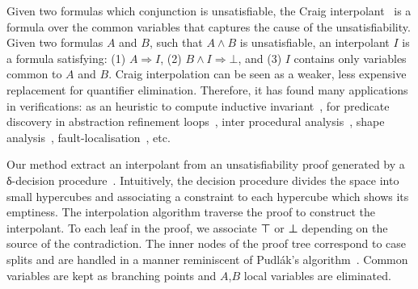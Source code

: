 Given two formulas which conjunction is unsatisfiable, the Craig interpolant~\cite{MR0104564} is a formula over the common variables that captures the cause of the unsatisfiability.
Given two formulas $A$ and $B$, such that $A ∧ B$ is unsatisfiable, an interpolant $I$ is a formula satisfying: (1) $A ⇒ I$, (2) $B ∧ I ⇒ ⊥$, and (3) $I$ contains only variables common to $A$ and $B$.
Craig interpolation can be seen as a weaker, less expensive replacement for quantifier elimination.
Therefore, it has found many applications in verifications:
as an heuristic to compute inductive invariant~\cite{DBLP:conf/cav/McMillan03,DBLP:conf/vmcai/McMillan07,DBLP:conf/sas/McMillan11},
for predicate discovery in abstraction refinement loops~\cite{DBLP:conf/cav/McMillan06},
inter procedural analysis~\cite{DBLP:conf/vmcai/AlbarghouthiGC12,DBLP:conf/cav/AlbarghouthiLGC12},
shape analysis~\cite{DBLP:conf/esop/AlbarghouthiBCK15},
fault-localisation~\cite{DBLP:conf/fm/ErmisSW12,DBLP:conf/vmcai/ChristESW13,DBLP:conf/sigsoft/SchafSW13}, etc.

Our method extract an interpolant from an unsatisfiability proof generated by a δ-decision procedure~\cite{DBLP:conf/synasc/GaoKC14}.
Intuitively, the decision procedure divides the space into small hypercubes and associating a constraint to each hypercube which shows its emptiness.
The interpolation algorithm traverse the proof to construct the interpolant.
To each leaf in the proof, we associate ⊤ or ⊥ depending on the source of the contradiction.
The inner nodes of the proof tree correspond to case splits and are handled in a manner reminiscent of Pudl{\'a}k's algorithm~\cite{MR1472134}.
Common variables are kept as branching points and $A$,$B$ local variables are eliminated.

